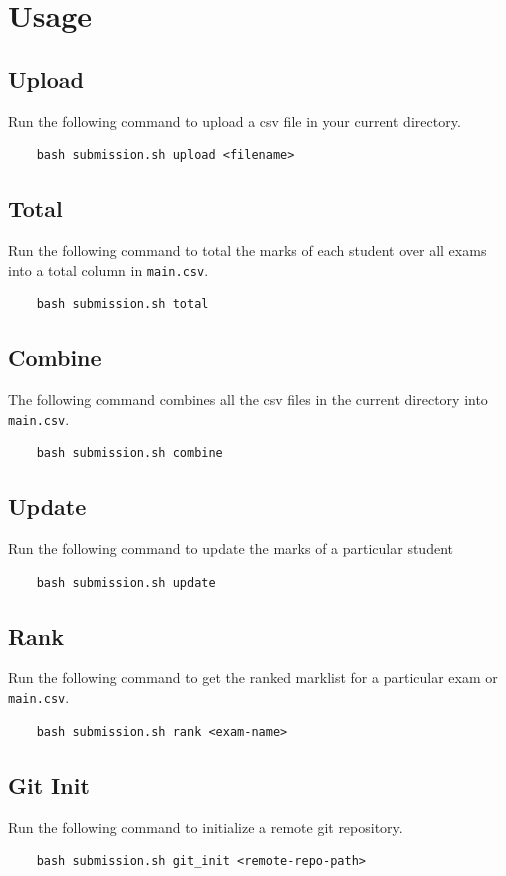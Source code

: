\documentclass{article}
\begin{document}
\section{Usage}
\subsection{Upload}
Run the following command to upload a csv file in your current directory.
\begin{verbatim}
    bash submission.sh upload <filename>
\end{verbatim}


\subsection{Total}
Run the following command to total the marks of each student over all exams into a total column in \verb"main.csv".
\begin{Verbatim}
    bash submission.sh total
\end{Verbatim}


\subsection{Combine}
The following command combines all the csv files in the current directory into \verb"main.csv".
\begin{Verbatim}
    bash submission.sh combine
\end{Verbatim}


\subsection{Update}
Run the following command to update the marks of a particular student
\begin{verbatim}
    bash submission.sh update
\end{verbatim}

\subsection{Rank}
Run the following command to get the ranked marklist for a particular exam or \verb"main.csv".
\begin{verbatim}
    bash submission.sh rank <exam-name>
\end{verbatim}

\subsection{Git Init}
Run the following command to initialize a remote git repository.
\begin{verbatim}
    bash submission.sh git_init <remote-repo-path>
\end{verbatim}
\end{document}
